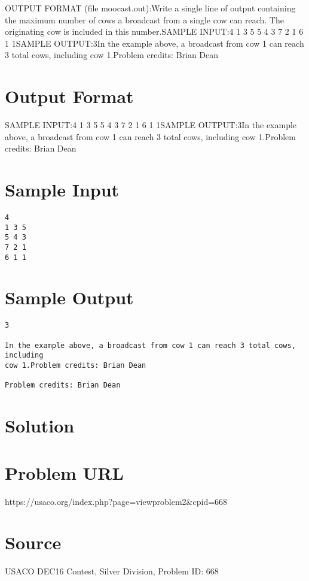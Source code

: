 \documentclass[12pt]{article}
\begin{document}
OUTPUT FORMAT (file moocast.out):Write a single line of output containing the maximum number of cows a broadcast
from a single cow can reach.  The originating cow is included in this number.SAMPLE INPUT:4
1 3 5
5 4 3
7 2 1
6 1 1SAMPLE OUTPUT:3In the example above, a broadcast from cow 1 can reach 3 total cows, including
cow 1.Problem credits: Brian Dean

\section*{Output Format}
SAMPLE INPUT:4
1 3 5
5 4 3
7 2 1
6 1 1SAMPLE OUTPUT:3In the example above, a broadcast from cow 1 can reach 3 total cows, including
cow 1.Problem credits: Brian Dean

\section*{Sample Input}
\begin{verbatim}
4
1 3 5
5 4 3
7 2 1
6 1 1
\end{verbatim}

\section*{Sample Output}
\begin{verbatim}
3

In the example above, a broadcast from cow 1 can reach 3 total cows, including
cow 1.Problem credits: Brian Dean

Problem credits: Brian Dean
\end{verbatim}

\section*{Solution}


\section*{Problem URL}
https://usaco.org/index.php?page=viewproblem2&cpid=668

\section*{Source}
USACO DEC16 Contest, Silver Division, Problem ID: 668
\end{document}
